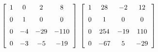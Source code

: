 {$\left[ \begin {array}{cccc} 1&0&2&8\\\noalign{\medskip}0&1&0&0
\\\noalign{\medskip}0&-4&-29&-110\\\noalign{\medskip}0&-3&-5&-19
\end {array} \right] $ 
}
{$ \left[ \begin {array}{cccc} 1&28&-2&12\\\noalign{\medskip}0&1&0&0
\\\noalign{\medskip}0&254&-19&110\\\noalign{\medskip}0&-67&5&-29
\end {array} \right]$}
